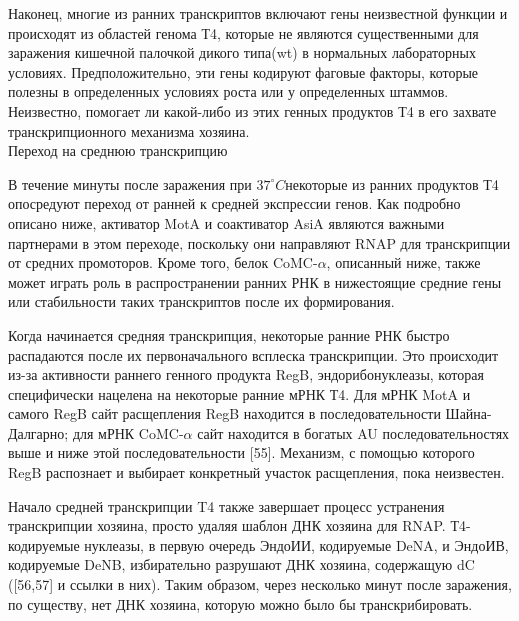 \documentclass[a4paper,12pt]{article}
\begin{document}
            \par{Наконец, многие из ранних транскриптов включают гены неизвестной функции и происходят из областей генома
            Т4, которые не являются существенными для заражения кишечной палочкой дикого типа(wt) в нормальных
            лабораторных условиях. Предположительно, эти гены кодируют фаговые факторы, которые полезны в определенных
            условиях роста или у определенных штаммов. Неизвестно, помогает ли какой-либо из этих генных продуктов Т4 в
            его захвате транскрипционного механизма хозяина.} \\
        {\Large Переход на среднюю транскрипцию}
            \par{В течение минуты после заражения при $ 37^{\circ}C $некоторые из ранних продуктов Т4 опосредуют переход
            от ранней к средней экспрессии генов. Как подробно описано ниже, активатор MotA и соактиватор AsiA являются
            важными партнерами в этом переходе, поскольку они направляют RNAP для транскрипции от средних промоторов.
            Кроме того, белок CoMC-$\alpha$, описанный ниже, также может играть роль в распространении ранних РНК в
            нижестоящие средние гены или стабильности таких транскриптов после их формирования.}
            \par{Когда начинается средняя транскрипция, некоторые ранние РНК быстро распадаются после их первоначального
            всплеска транскрипции. Это происходит из-за активности раннего генного продукта RegB, эндорибонуклеазы,
            которая специфически нацелена на некоторые ранние мРНК Т4. Для мРНК MotA и самого RegB сайт расщепления RegB
            находится в последовательности Шайна-Далгарно; для мРНК CoMC-$\alpha$ сайт находится в богатых AU
            последовательностях выше и ниже этой последовательности [55]. Механизм, с помощью которого RegB распознает и
            выбирает конкретный участок расщепления, пока неизвестен.}
            \par{Начало средней транскрипции T4 также завершает процесс устранения транскрипции хозяина, просто удаляя
            шаблон ДНК хозяина для RNAP. Т4-кодируемые нуклеазы, в первую очередь ЭндоИИ, кодируемые DeNA, и ЭндоИВ,
            кодируемые DeNB, избирательно разрушают ДНК хозяина, содержащую dC ([56,57] и ссылки в них). Таким образом,
            через несколько минут после заражения, по существу, нет ДНК хозяина, которую можно было бы транскрибировать.}
\end{document}

